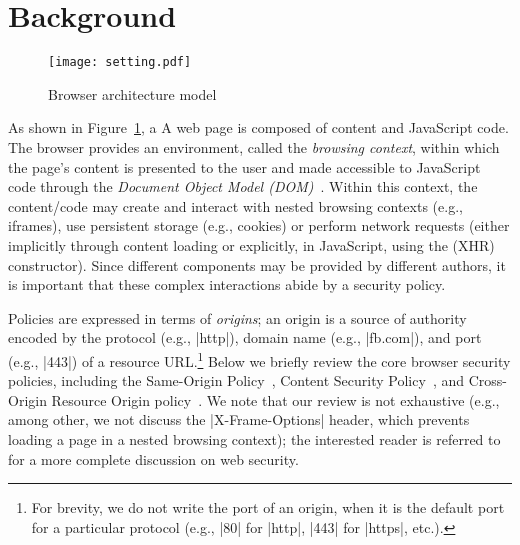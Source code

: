 \section{Background}
\label{sec:background}

%
\iffigures
\begin{figure}
\begin{center}
\texttt{[image: setting.pdf]}
\end{center}
\vspace{-10pt}
\caption{\label{fig:browser-arch} Browser architecture model}
\vspace{-10pt}
\end{figure}
As shown in Figure~\ref{fig:browser-arch}, a 
\else
A
\fi
web page is composed of
content and JavaScript code.
%
The browser provides an environment, called the \emph{browsing
context}, within which the page's content is presented to the user and
made accessible to JavaScript code through the \emph{Document Object
Model (DOM)}~\cite{html5}.
%
Within this context, the content/code may create and interact with
nested browsing contexts (e.g., iframes), use persistent storage
(e.g., cookies) or perform network requests (either implicitly through
content loading or explicitly, in JavaScript, using the \xhr{} (XHR)
constructor).
%
Since different components may be provided by different authors, it is
important that these complex interactions abide by a security policy.
 
Policies are expressed in terms of \emph{origins}; an origin is a
source of authority encoded by the protocol (e.g., \js|http|), domain
name (e.g., \js|fb.com|), and port (e.g., \js|443|) of a resource
URL.\footnote{
  For brevity, we do not write the port of an origin, when it is the
  default port for a particular protocol (e.g., \js|80| for \js|http|,
  \js|443| for \js|https|, etc.).
}
%
Below we briefly review the core browser security policies, including
the Same-Origin Policy~\cite{rfc6454}, Content Security
Policy~\cite{csp}, and Cross-Origin Resource Origin
policy~\cite{cors13}.
%
%
We note that our review is not exhaustive (e.g., among other, we not
discuss the \js|X-Frame-Options| header, which prevents loading a page
in a nested browsing context);  the interested reader is referred
to~\cite{googlehandbook} for a more complete discussion on web security.



